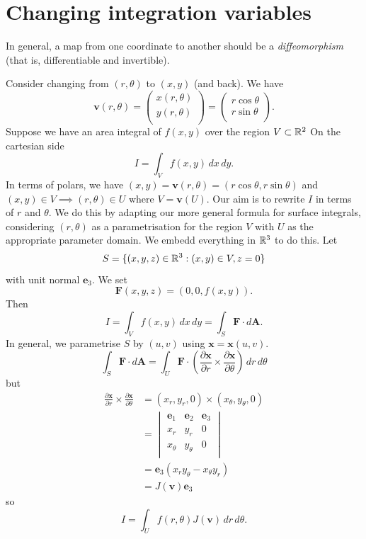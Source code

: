 \section{Changing integration variables}

In general, a map from one coordinate to another should be a
\emph{diffeomorphism} (that is, differentiable and invertible).

\begin{example}
    Consider changing from $(r, \theta)$ to $(x,y)$ (and back).
    We have
    \[
        \bm v(r, \theta) =
        \begin{pmatrix}
            x(r,\theta) \\
            y(r,\theta) \\
        \end{pmatrix}
        =
        \begin{pmatrix}
            r\cos\theta \\
            r\sin\theta \\
        \end{pmatrix}
        .
    \]
    Suppose we have an area integral of $f(x,y)$ over the
    region $V \subset \mathbb{R}^2$
    On the cartesian side
    \[
        I = \int_V f(x,y) \,dx\,dy.
    \]
    In terms of polars, we have 
    $(x,y) = \bm v(r, \theta) = (r\cos\theta, r\sin\theta)$
    and $(x,y) \in V \implies (r,\theta) \in U$
    where $V = \bm v(U)$.
    Our aim is to rewrite $I$ in terms of $r$ and $\theta$.
    We do this by adapting our more general formula for surface
    integrals, considering $(r, \theta)$ as a parametrisation
    for the region $V$ with $U$ as the appropriate parameter domain.
    We embedd everything in $\mathbb{R}^3$ to do this.
    Let
    \[
        S = \{ (x,y,z)\in\mathbb{R}^3: (x,y) \in V, z = 0 \}
    \]
    with unit normal $\bm e_3$.
    We set
    \[
        \bm F(x,y,z) = (0,0,f(x,y)).
    \]
    Then
    \[
        I = \int_V f(x,y) \,dx\,dy = \int_S \bm F \cdot d\bm A.
    \]
    In general, we parametrise $S$ by $(u,v)$ using $\bm x = \bm x(u,v)$.
    \[
        \int_S \bm F \cdot d\bm A = \int_U \bm F \cdot
        \left(
            \frac{\partial \bm x}{\partial r} 
            \times
            \frac{\partial \bm x}{\partial \theta} 
        \right)
        \,dr\,d\theta
    \]
    but
    \begin{align*}
        \frac{\partial \bm x}{\partial r}
        \times
        \frac{\partial \bm x}{\partial \theta}
        &= (x_r, y_r, 0) \times (x_\theta, y_\theta, 0) \\
        &=
        \begin{vmatrix}
            \bm e_1 & \bm e_2 & \bm e_3 \\
            x_r & y_r & 0 \\
            x_\theta & y_\theta & 0 \\
        \end{vmatrix}
        \\
        &= \bm e_3(x_ry_\theta - x_\theta y_r) \\
        &= J(\bm v)\bm e_3
    \end{align*}
    so
    \[
        I = \int_U f(r,\theta) J(\bm v) \,dr\,d\theta. \tag{$\star$}
    \]
\end{example}


